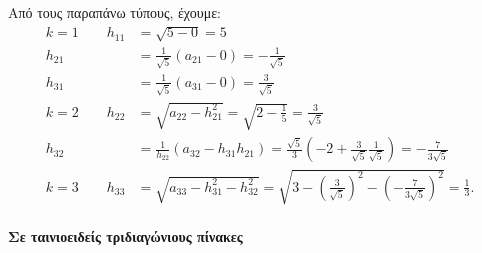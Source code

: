 \documentclass[11pt,a4paper,notitlepage,fleqn]{article}
\begin{document}
Από τους παραπάνω τύπους, έχουμε:
\begin{align*}
	\boxed{k=1} \qquad
	h_{11} &= \sqrt{5-0} = 5 \\
	h_{21} &= \frac{1}{\sqrt{5}} \left(a_{21}-0\right)=
	-\frac{1}{\sqrt{5}} \\
	h_{31} &= \frac{1}{\sqrt{5}} (a_{31}-0)=\frac{3}{\sqrt{5}} \\
	\boxed{k=2} \qquad h_{22} &= \sqrt{a_{22}-h_{21}^2}
	= \sqrt{2-\frac{1}{5}} = \frac{3}{\sqrt{5}}
	\\ h_{32} &= \frac{1}{h_{22}}(a_{32}-h_{31}h_{21})
	=\frac{\sqrt{5}}{3}\left(
	-2+\frac{3}{\sqrt{5}}\frac{1}{\sqrt{5}}\right)
	= -\frac{7}{3\sqrt{5}}
	\\ \boxed{k=3} \qquad h_{33} &=
	\sqrt{a_{33}-h_{31}^2-h_{32}^2}=
	\sqrt{3-\left(\frac{3}{\sqrt{5}}\right)^2
	-\left(-\frac{7}{3\sqrt{5}}\right)^2} = \frac{1}{3}.
\end{align*}

\paragraph{Σε ταινιοειδείς τριδιαγώνιους πίνακες}
\hspace{0pt}
\end{document}
